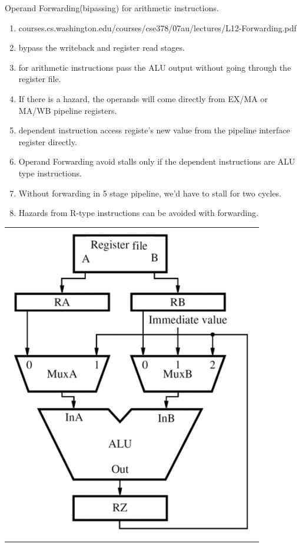 \begin{enumerate}
\begin{minipage}{\linewidth}
    \newpage

    \item Operand Forwarding(bipassing) for arithmetic instructions.
    \begin{enumerate}
        \item courses.cs.washington.edu/courses/cse378/07au/lectures/L12-Forwarding.pdf
        \item bypass the writeback and register read stages.
        \item for arithmetic instructions pass the ALU output without going through the register file.
        \item If there is a hazard, the operands will come directly from EX/MA or MA/WB pipeline registers.
        \item dependent instruction access registe's new value from the pipeline interface register directly.
        \item Operand Forwarding avoid stalls only if the dependent instructions are ALU type instructions.
        \item Without forwarding in 5 stage pipeline, we’d have to stall for two cycles.
        \item Hazards from R-type instructions can be avoided with forwarding.
    \end{enumerate}

    \begin{center}
    \begin{myTableStyle} \begin{tabular}{ c }
               \includegraphics[scale=0.7]{./images/oprand_forwarding.jpeg}  \\
    \end{tabular} \end{myTableStyle} \vspace{0.08in}
    \end{center}
    \end{minipage}


\end{enumerate}
